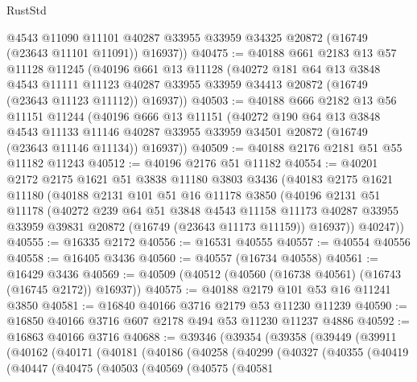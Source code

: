 \begin{lexlean}{RustStd}
\begin{coremodule}
        @4543
        @11090
        @11101
        @40287
        @33955
        @33959
        @34325
        @20872
        (@16749 (@23643 @11101 @11091))
        @16937))
@40475 := @40188
    @661
    @2183
    @13
    @57
    @11128
    @11245
    (@40196
      @661
      @13
      @11128
      (@40272
        @181
        @64
        @13
        @3848
        @4543
        @11111
        @11123
        @40287
        @33955
        @33959
        @34413
        @20872
        (@16749 (@23643 @11123 @11112))
        @16937))
@40503 := @40188
    @666
    @2182
    @13
    @56
    @11151
    @11244
    (@40196
      @666
      @13
      @11151
      (@40272
        @190
        @64
        @13
        @3848
        @4543
        @11133
        @11146
        @40287
        @33955
        @33959
        @34501
        @20872
        (@16749 (@23643 @11146 @11134))
        @16937))
@40509 := @40188 @2176 @2181 @51 @55 @11182 @11243
@40512 := @40196 @2176 @51 @11182
@40554 := @40201
    @2172
    @2175
    @1621
    @51
    @3838
    @11180
    @3803
    @3436
    (@40183
      @2175
      @1621
      @11180
      (@40188
        @2131
        @101
        @51
        @16
        @11178
        @3850
        (@40196
          @2131
          @51
          @11178
          (@40272
            @239
            @64
            @51
            @3848
            @4543
            @11158
            @11173
            @40287
            @33955
            @33959
            @39831
            @20872
            (@16749 (@23643 @11173 @11159))
            @16937))
        @40247))
@40555 := @16335 @2172
@40556 := @16531 @40555
@40557 := @40554 @40556
@40558 := @16405 @3436
@40560 := @40557 (@16734 @40558)
@40561 := @16429 @3436
@40569 := @40509 (@40512 (@40560 (@16738 @40561) (@16743 (@16745 @2172)) @16937))
@40575 := @40188 @2179 @101 @53 @16 @11241 @3850
@40581 := @16840 @40166 @3716 @2179 @53 @11230 @11239
@40590 := @16850 @40166 @3716 @607 @2178 @494 @53 @11230 @11237 @4886
@40592 := @16863 @40166 @3716
@40688 := @39346
    (@39354
      (@39358
        (@39449
          (@39911
            (@40162
              (@40171
                (@40181
                  (@40186
                    (@40258
                      (@40299
                        (@40327
                          (@40355
                            (@40419
                              (@40447
                                (@40475
                                  (@40503
                                    (@40569
                                      (@40575
                                        (@40581

\end{coremodule}
\end{lexlean}
